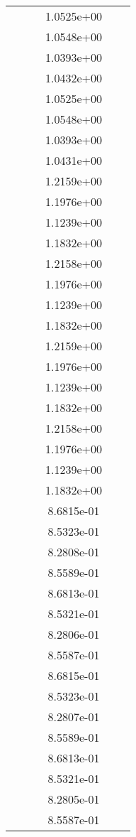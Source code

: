 \begin{xltabular}{\textwidth}{r|rS[table-format=1.3e+2]S[table-format=1.4e+2]S[table-format=1.4e+2]S[table-format=-1.5]}
&  &  & 1.0525e+00 & & \\
&  &  & 1.0548e+00 & & \\
&  &  & 1.0393e+00 & & \\
&  &  & 1.0432e+00 & & \\
&  &  & 1.0525e+00 & & \\
&  &  & 1.0548e+00 & & \\
&  &  & 1.0393e+00 & & \\
&  &  & 1.0431e+00 & & \\
&  &  & 1.2159e+00 & & \\
&  &  & 1.1976e+00 & & \\
&  &  & 1.1239e+00 & & \\
&  &  & 1.1832e+00 & & \\
&  &  & 1.2158e+00 & & \\
&  &  & 1.1976e+00 & & \\
&  &  & 1.1239e+00 & & \\
&  &  & 1.1832e+00 & & \\
&  &  & 1.2159e+00 & & \\
&  &  & 1.1976e+00 & & \\
&  &  & 1.1239e+00 & & \\
&  &  & 1.1832e+00 & & \\
&  &  & 1.2158e+00 & & \\
&  &  & 1.1976e+00 & & \\
&  &  & 1.1239e+00 & & \\
&  &  & 1.1832e+00 & & \\
&  &  & 8.6815e-01 & & \\
&  &  & 8.5323e-01 & & \\
&  &  & 8.2808e-01 & & \\
&  &  & 8.5589e-01 & & \\
&  &  & 8.6813e-01 & & \\
&  &  & 8.5321e-01 & & \\
&  &  & 8.2806e-01 & & \\
&  &  & 8.5587e-01 & & \\
&  &  & 8.6815e-01 & & \\
&  &  & 8.5323e-01 & & \\
&  &  & 8.2807e-01 & & \\
&  &  & 8.5589e-01 & & \\
&  &  & 8.6813e-01 & & \\
&  &  & 8.5321e-01 & & \\
&  &  & 8.2805e-01 & & \\
&  &  & 8.5587e-01 & & \\

\end{xltabular}
